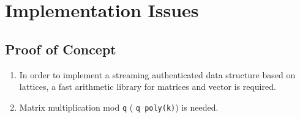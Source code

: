 \documentclass[11pt, letterpaper, oneside]{article}
\begin{document}




\section{Implementation Issues\\}
\subsection{Proof of Concept}
	\begin{enumerate}
	\item In order to implement a streaming authenticated data structure based on lattices, a fast
	arithmetic library for matrices and vector is required.
	\item Matrix multiplication mod \texttt{q} ( \texttt{q poly(k)}) is needed.
	\end{enumerate}
\end{document}
